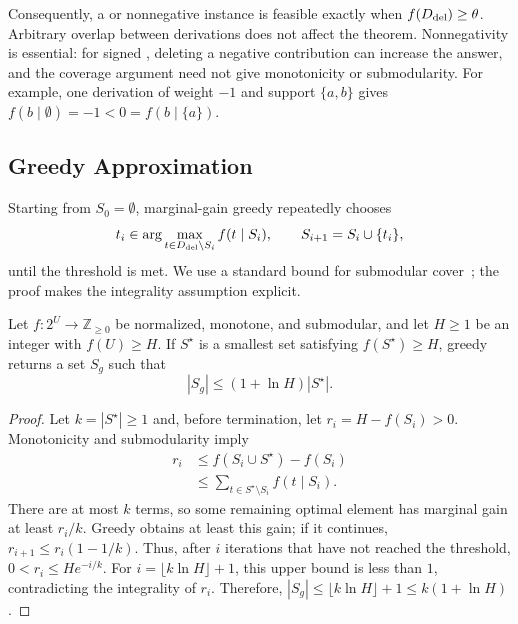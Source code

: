 Consequently, a  or nonnegative  instance is
feasible exactly when $f(D_{\mathrm{del}})\ge\theta$. Arbitrary overlap between
derivations does not affect the theorem. Nonnegativity is essential:
for signed , deleting a negative contribution can increase
the answer, and the coverage argument need not give monotonicity or
submodularity. For example, one derivation of weight $-1$ and support
$\{a,b\}$ gives $f(b\mid\emptyset)=-1<0=f(b\mid\{a\})$.

\subsection{Greedy Approximation}
\label{sec:submod-greedy}

Starting from $S_0=\emptyset$, marginal-gain greedy repeatedly chooses
\begin{equation}
\label{eq:greedy-choice}
t_i\in\arg\max_{t\in D_{\mathrm{del}}\setminus S_i}f(t\mid S_i),
\qquad S_{i+1}=S_i\cup\{t_i\},
\end{equation}
until the threshold is met. We use a standard bound for
submodular cover~\cite{wolsey1982greedy}; the proof makes the
integrality assumption explicit.

\begin{theorem}
\label{thm:general-greedy}
Let $f:2^U\to\mathbb{Z}_{\ge0}$ be normalized, monotone, and submodular,
and let $H\ge1$ be an integer with $f(U)\ge H$.
If $S^\star$ is a smallest set satisfying $f(S^\star)\ge H$, greedy
returns a set $S_g$ such that
\begin{equation}
\label{eq:general-greedy-bound}
|S_g|\le(1+\ln H)|S^\star|.
\end{equation}
\end{theorem}
\begin{proof}
Let $k=|S^\star|\ge1$ and, before termination, let
$r_i=H-f(S_i)>0$. Monotonicity and submodularity imply
\[
\begin{aligned}
r_i&\le f(S_i\cup S^\star)-f(S_i)\\
&\le\sum_{t\in S^\star\setminus S_i}f(t\mid S_i).
\end{aligned}
\]
There are at most $k$ terms, so some remaining optimal element has
marginal gain at least $r_i/k$. Greedy obtains at least this gain;
if it continues, $r_{i+1}\le r_i(1-1/k)$. Thus, after $i$ iterations
that have not reached the threshold, $0<r_i\le H e^{-i/k}$.
For $i=\lfloor k\ln H\rfloor+1$, this upper bound is less than $1$,
contradicting the integrality of $r_i$. Therefore,
$|S_g|\le\lfloor k\ln H\rfloor+1\le k(1+\ln H)$.
\end{proof}


